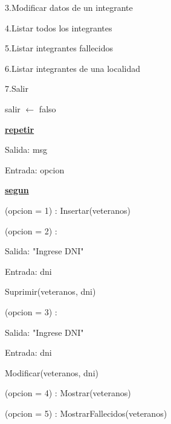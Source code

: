 \documentclass{article}
\begin{document}
        \hspace{17mm}3.Modificar datos de un integrante

        \hspace{17mm}4.Listar todos los integrantes

        \hspace{17mm}5.Listar integrantes fallecidos

        \hspace{17mm}6.Listar integrantes de una localidad

        \hspace{17mm}7.Salir

    \hspace{4mm}salir $\leftarrow$ falso

    \hspace{4mm}\underline{\textbf{repetir}} 

    \hspace{8mm}Salida: msg

    \hspace{8mm}Entrada: opcion

    \hspace{8mm}\underline{\textbf{segun}}

    \hspace{12mm}(opcion = 1) : Insertar(veteranos)

    \hspace{12mm}(opcion = 2) :

        \hspace{16mm}Salida: "Ingrese DNI"

        \hspace{16mm}Entrada: dni
        
        \hspace{16mm}Suprimir(veteranos, dni)

    \hspace{12mm}(opcion = 3) : 
    
        \hspace{16mm}Salida: "Ingrese DNI"

        \hspace{16mm}Entrada: dni
        
        \hspace{16mm}Modificar(veteranos, dni)

    \hspace{12mm}(opcion = 4) : Mostrar(veteranos)

    \hspace{12mm}(opcion = 5) : MostrarFallecidos(veteranos)
\end{document}
